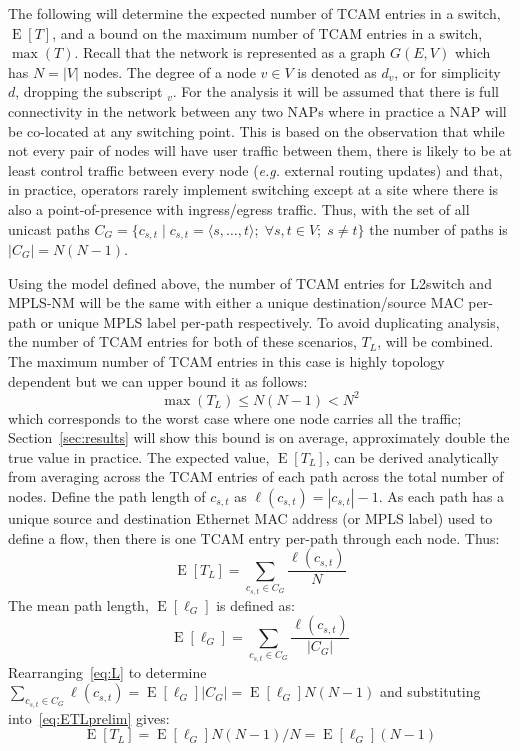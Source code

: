 \documentclass[conference]{IEEEtran}
\DeclareMathOperator{\E}{E}
\begin{document}
The following will determine the expected number of TCAM entries in a switch, $\E[T]$, and a bound on the maximum number of TCAM entries in a switch, $\max(T)$. Recall that the network is represented as a graph $G(E,V)$ which has $N=|V|$ nodes. The degree of a node $v \in V$ is denoted as $d_v$, or for simplicity $d$, dropping the subscript $_v$. For the analysis it will be assumed that there is full connectivity in the network between any two NAPs where in practice a NAP will be co-located at any switching point. This is based on the observation that while not every pair of nodes will have user traffic between them, there is likely to be at least control traffic between every node (\emph{e.g.} external routing updates) and that, in practice, operators rarely implement switching except at a site where there is also a point-of-presence with ingress/egress traffic. Thus, with the set of all unicast paths $C_G=\{c_{s,t}\;|\;c_{s,t}=\langle s,\ldots, t\rangle; \; \forall s,t\in V; \; s\neq t\}$ the number of paths is $|C_G|=N(N-1)$.

Using the model defined above, the number of TCAM entries for L2switch and MPLS-NM will be the same with either a unique destination/source MAC per-path or unique MPLS label per-path respectively. To avoid duplicating analysis, the number of TCAM entries for both of these scenarios, $T_L$, will be combined.  The maximum number of TCAM entries in this case is highly topology dependent but we can upper bound it as follows: 
\begin{equation}
\label{eq:maxTL} \max(T_L) \leq N(N-1) < N^2 
\end{equation}
which corresponds to the worst case where one node carries all the traffic;  Section~\ref{sec:results} will show this bound is on average, approximately double the true value in practice.  The expected value, $\E[T_L]$, can be derived analytically from averaging across the TCAM entries of each path across the total number of nodes. Define the path length of $c_{s,t}$ as $\ell (c_{s,t})=|c_{s,t}|-1$. As each path has a unique source and destination Ethernet MAC address (or MPLS label) used to define a flow, then there is one TCAM entry per-path through each node. Thus:
\begin{equation}
  \label{eq:ETLprelim}
  \E[T_L] = \sum_{ c_{s,t}\in C_G} \frac{\ell(c_{s,t})}{N}
\end{equation}
The mean path length, $\E[\ell_G]$ is defined as:
\begin{equation}
  \label{eq:L}
  \E[\ell_G] = \sum_{ c_{s,t}\in C_G}\frac{\ell(c_{s,t})}{|C_G|}
\end{equation}
Rearranging~\eqref{eq:L} to determine $\sum_{ c_{s,t}\in C_G}
\ell(c_{s,t}) = \E[\ell_G] |C_G| = \E[\ell_G] N(N-1)$ and substituting
into~\eqref{eq:ETLprelim} gives:
\begin{equation}
  \label{eq:ETL}
    \E[T_L] =  \E[\ell_G] N(N-1)/N = \E[\ell_G] (N-1)
\end{equation}
\end{document}
